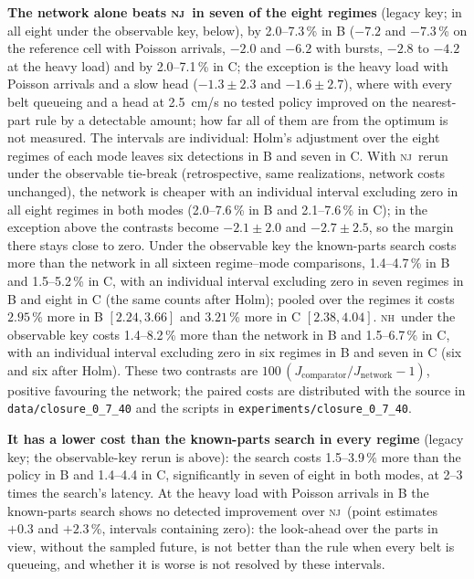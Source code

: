 \documentclass[11pt,a4paper]{article}
\theoremstyle{plain}
\theoremstyle{definition}
\theoremstyle{remark}
\newcommand{\nj}{\textsc{nj}}
\newcommand{\nh}{\textsc{nh}}
\begin{document}
\textbf{The network alone beats \nj\ in seven of the eight regimes} (legacy key; in all
eight under the observable key, below), by 2.0--7.3\,\% in B
($-7.2$ and $-7.3$\,\% on the reference cell with Poisson arrivals, $-2.0$ and $-6.2$ with
bursts, $-2.8$ to $-4.2$ at the heavy load) and by 2.0--7.1\,\% in C; the exception is the
heavy load with Poisson arrivals and a slow head ($-1.3\pm2.3$ and $-1.6\pm2.7$), where
with every belt queueing and a head at 2.5~cm/s no tested policy improved on the
nearest-part rule by a detectable amount; how far all of them are from the optimum is
not measured. The intervals are individual: Holm's adjustment over the eight regimes of
each mode leaves six detections in B and seven in C. With \nj\ rerun under the observable
tie-break (retrospective, same realizations, network costs unchanged), the network is
cheaper with an individual interval excluding zero in all eight regimes in both modes
(2.0--7.6\,\% in B and 2.1--7.6\,\% in C); in the exception above the contrasts become
$-2.1\pm2.0$ and $-2.7\pm2.5$, so the margin there stays close to zero. Under the
observable key the known-parts search costs more than the network in all sixteen
regime--mode comparisons, 1.4--4.7\,\% in B and 1.5--5.2\,\% in C, with an individual
interval excluding zero in seven regimes in B and eight in C (the same counts after Holm);
pooled over the regimes it costs $2.95$\,\% more in B $[2.24,3.66]$ and $3.21$\,\% more in C
$[2.38,4.04]$. \nh\ under the observable key costs 1.4--8.2\,\% more than the network in B
and 1.5--6.7\,\% in C, with an individual interval excluding zero in six regimes in B and
seven in C (six and six after Holm). These two contrasts are
$100\,(J_{\mathrm{comparator}}/J_{\mathrm{network}}-1)$, positive favouring the network; the
paired costs are distributed with the source in \texttt{data/closure\_0\_7\_40} and the
scripts in \texttt{experiments/closure\_0\_7\_40}.

\textbf{It has a lower cost than the known-parts search in every regime} (legacy key; the
observable-key rerun is above): the search costs 1.5--3.9\,\% more than the policy in B and
1.4--4.4 in C, significantly in seven of eight in both modes, at 2--3 times the search's
latency. At the heavy load with Poisson arrivals in B the known-parts search shows no detected
improvement over \nj\ (point estimates $+0.3$ and $+2.3$\,\%, intervals containing zero):
the look-ahead over the parts in view, without the sampled future, is not better than
the rule when every belt is queueing, and whether it is worse is not resolved by these
intervals.
\end{document}
